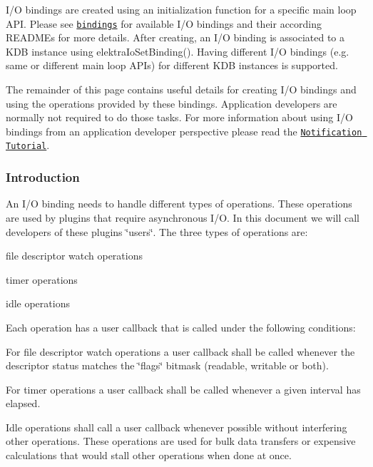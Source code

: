 I/O bindings are created using an initialization function for a specific main loop A\+PI. Please see \href{https://www.libelektra.org/bindings/readme}{\tt bindings} for available I/O bindings and their according R\+E\+A\+D\+M\+Es for more details. After creating, an I/O binding is associated to a K\+DB instance using elektra\+Io\+Set\+Binding(). Having different I/O bindings (e.\+g. same or different main loop A\+P\+Is) for different K\+DB instances is supported.

The remainder of this page contains useful details for creating I/O bindings and using the operations provided by these bindings. Application developers are normally not required to do those tasks. For more information about using I/O bindings from an application developer perspective please read the \href{doc_tutorials_notifications_md.html}{\tt Notification Tutorial}.\hypertarget{group__kdbio_Introduction}{}\subsubsection{Introduction}\label{group__kdbio_Introduction}
An I/O binding needs to handle different types of operations. These operations are used by plugins that require asynchronous I/O. In this document we will call developers of these plugins \char`\"{}users\char`\"{}. The three types of operations are\+:
\begin{DoxyItemize}
\item file descriptor watch operations
\item timer operations
\item idle operations
\end{DoxyItemize}

Each operation has a user callback that is called under the following conditions\+:
\begin{DoxyItemize}
\item For file descriptor watch operations a user callback shall be called whenever the descriptor status matches the \char`\"{}flags\char`\"{} bitmask (readable, writable or both).
\item For timer operations a user callback shall be called whenever a given interval has elapsed.
\item Idle operations shall call a user callback whenever possible without interfering other operations. These operations are used for bulk data transfers or expensive calculations that would stall other operations when done at once.
\end{DoxyItemize}

